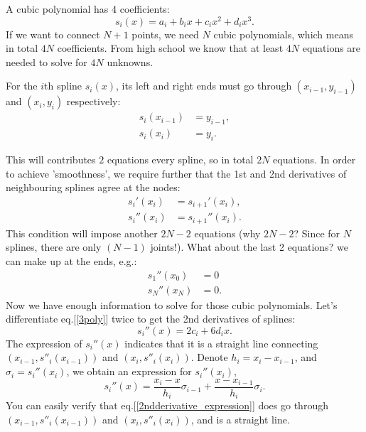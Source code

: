 \documentclass[paper=a4,fontsize=11pt]{scrartcl} %
\begin{document}
A cubic polynomial has 4 coefficients:
\begin{equation}\label{3poly}
s_i(x) = a_i + b_ix + c_ix^2 + d_ix^3.
\end{equation}
If we want to connect $N+1$ points, we need $N$ cubic polynomials, which means in total $4N$ coefficients. From high school we know that at least $4N$ equations are needed to solve for $4N$ unknowns. 

For the $i$th spline $s_i(x)$, its left and right ends must go through $(x_{i-1}, y_{i-1})$ and $(x_i, y_i)$ respectively:
\begin{equation}\label{spline_value_restriction}
\begin{split}
s_i(x_{i-1}) & = y_{i-1}, \\
s_i(x_i) & = y_{i}.
\end{split}
\end{equation}

This will contributes $2$ equations every spline, so in total $2N$ equations. In order to achieve 'smoothness', we require further that the 1st and 2nd derivatives of neighbouring splines agree at the nodes:
\begin{equation}\label{spline_dev_restriction}
\begin{split}
s_i'(x_{i}) & = s_{i+1}'(x_{i}), \\
s_i''(x_{i}) & = s_{i+1}''(x_{i}).
\end{split}
\end{equation}
This condition will impose another $2N-2$ equations (why $2N-2$? Since for $N$ splines, there are only $(N-1)$ joints!). What about the last 2 equations? we can make up at the ends, e.g.:
\begin{equation}\label{derivative_end}
\begin{split}
s_1''(x_{0}) & = 0 \\
s_{N}''(x_{N}) & = 0.
\end{split}
\end{equation}
Now we have enough information to solve for those cubic polynomials. Let's differentiate eq.[\ref{3poly}] twice to get the 2nd derivatives of splines:
\begin{equation}\label{3poly_2ndderivative}
s_i''(x) = 2 c_i + 6d_ix.
\end{equation}
The expression of $s_i''(x)$ indicates that it is a straight line connecting $(x_{i-1}, s''_{i}(x_{i-1}))$ and $(x_i, s''_i(x_{i}))$. Denote $h_i = x_i - x_{i-1}$, and $\sigma_i = s_i''(x_i)$, we obtain an expression for $s_i''(x_i)$,
\begin{equation}\label{2ndderivative_expression}
s_i''(x) = \frac{x_i - x}{h_i}\sigma_{i-1} + \frac{x - x_{i-1}}{h_i}\sigma_{i}.
\end{equation}
You can easily verify that eq.[\ref{2ndderivative_expression}] does go through $(x_{i-1}, s''_{i}(x_{i-1}))$ and $(x_i, s''_i(x_{i}))$, and is a straight line.
\end{document}
